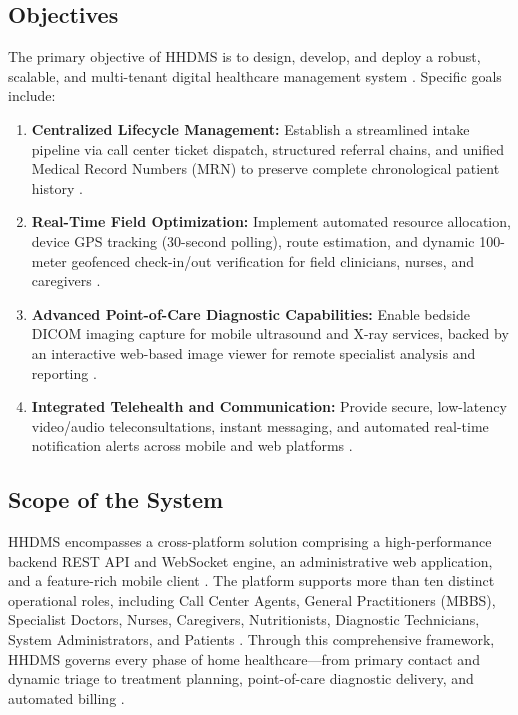\documentclass[lettersize,onecolumn,journal]{IEEEtran}
\begin{document}
	\subsection{Objectives}
	The primary objective of HHDMS is to design, develop, and deploy a robust, scalable, and multi-tenant digital healthcare management system \cite{srs2026}. Specific goals include:
	\begin{enumerate}
		\item \textbf{Centralized Lifecycle Management:} Establish a streamlined intake pipeline via call center ticket dispatch, structured referral chains, and unified Medical Record Numbers (MRN) to preserve complete chronological patient history \cite{srs2026}.
		\item \textbf{Real-Time Field Optimization:} Implement automated resource allocation, device GPS tracking (30-second polling), route estimation, and dynamic 100-meter geofenced check-in/out verification for field clinicians, nurses, and caregivers \cite{zandbergen2009accuracy, haversine_formula, osrm_routing}.
		\item \textbf{Advanced Point-of-Care Diagnostic Capabilities:} Enable bedside DICOM imaging capture for mobile ultrasound and X-ray services, backed by an interactive web-based image viewer for remote specialist analysis and reporting \cite{dicom2021, pacs2001, cornerstone3d}.
		\item \textbf{Integrated Telehealth and Communication:} Provide secure, low-latency video/audio teleconsultations, instant messaging, and automated real-time notification alerts across mobile and web platforms \cite{fette2011websocket, agorawebrtc}.
	\end{enumerate}
	
	\subsection{Scope of the System}
	HHDMS encompasses a cross-platform solution comprising a high-performance backend REST API and WebSocket engine, an administrative web application, and a feature-rich mobile client \cite{srs2026, nestjs_framework, nextjs_app_router}. The platform supports more than ten distinct operational roles, including Call Center Agents, General Practitioners (MBBS), Specialist Doctors, Nurses, Caregivers, Nutritionists, Diagnostic Technicians, System Administrators, and Patients \cite{srs2026, rbac_standard}. Through this comprehensive framework, HHDMS governs every phase of home healthcare—from primary contact and dynamic triage to treatment planning, point-of-care diagnostic delivery, and automated billing \cite{srs2026, accv2016}.
	
\end{document}

